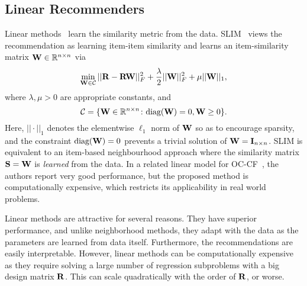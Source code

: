 \subsection{Linear Recommenders}

Linear methods~\cite{Ning:2011, Sedhain:2016} learn the similarity metric from the data. SLIM~\citep{Ning:2011} views the recommendation as learning item-item similarity and learns an item-similarity matrix $\mathbf{W} \in \mathbb{R}^{n \times n}$ via
\begin{equation}
\label{eqn:slim}
\min_{ \mathbf{W} \in \mathcal{C} } || \mathbf{R} - \mathbf{R} \mathbf{W} ||_F^2 + \frac{\lambda}{2} || \mathbf{W} ||_F^2 + \mu || \mathbf{W} ||_1,
\end{equation}
where $\lambda, \mu > 0$ are appropriate constants, and
\begin{equation}
\label{eqn:slim-constraint}
\mathcal{C} = \{ \mathbf{W} \in \mathbb{R}^{n \times n} \colon \text{diag}( \mathbf{W} ) = 0, \mathbf{W} \geq 0 \}.
\end{equation}
Here, $|| \cdot ||_1$ denotes the elementwise $\ell_1$ norm of $\mathbf{W}$ so as to encourage sparsity, and the constraint $\text{diag}( \mathbf{W} ) = 0$ prevents a trivial solution of $\mathbf{W} = \mathbf{I}_{n \times n}$. SLIM is equivalent to an item-based neighbourhood approach where the similarity matrix $\mathbf{S} = \mathbf{W}$ is \emph{learned} from the data.
%
In a related linear model for OC-CF~\citep{Sedhain:2016}, the authors report very good performance, but the proposed method is computationally expensive, which restricts its applicability in real world problems.


Linear methods are attractive for several reasons. They have superior performance, and unlike neighborhood methods, they adapt with the data as the parameters are learned from data itself. Furthermore, the recommendations are easily interpretable. However, linear methods can be computationally expensive as they require solving a large number of regression subproblems with a big design matrix $\mathbf{R}$. This can scale quadratically with the order of $\mathbf{R}$, or worse.

